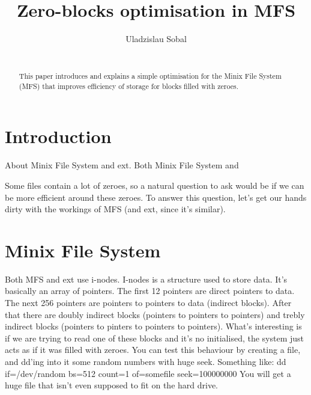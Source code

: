 \documentclass{sig-alternate-05-2015}
\begin{document}




%

\title{Zero-blocks optimisation in MFS}

%
\author{
\alignauthor
Uladzislau Sobal\\
       \\
}

\maketitle
\begin{abstract}
    This paper introduces and explains a simple optimisation for the Minix File System (MFS) that
    improves efficiency of storage for blocks filled with zeroes.
\end{abstract}

\section{Introduction}

About Minix File System and ext.
Both Minix File System and 

Some files contain a lot of zeroes, so a natural question to ask would be if we can be more efficient
around these zeroes. To answer this question, let's get our hands dirty with the workings of MFS 
(and ext, since it's similar).

\section{Minix File System}
Both MFS and ext use i-nodes. I-nodes is a structure used to store data. It's basically an array of pointers.
The first 12 pointers are direct pointers to data.
The next 256 pointers are pointers to pointers to data (indirect blocks).
After that there are doubly indirect blocks (pointers to pointers to pointers)
and trebly indirect blocks (pointers to pinters to pointers to pointers).
What's interesting is if we are trying to read one of these blocks and it's no initialised, the system
just acts as if it was filled with zeroes. You can test this behaviour by creating a file, and 
dd'ing into it some random numbers with huge seek. 
Something like:
dd if=/dev/random bs=512 count=1 of=somefile seek=100000000
You will get a huge file that isn't even supposed to fit on the hard drive.
\end{document}
